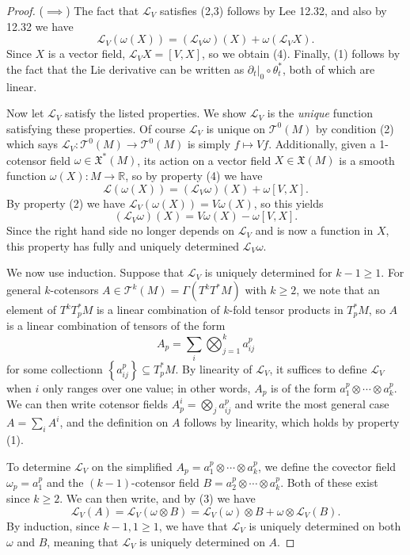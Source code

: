 \documentclass[11pt, letterpaper]{article}
\begin{document}
\begin{proof}
	($\implies $) The fact that $\mathcal{L} _V$ satisfies (2,3) follows by Lee 12.32, and also by 12.32 we have
	\[
		\mathcal{L} _V(\omega (X)) = (\mathcal{L} _V\omega )(X) + \omega (\mathcal{L} _VX)
	.\]
	Since $X$ is a vector field, $\mathcal{L} _VX=[V,X]$, so we obtain (4). Finally, (1) follows by the fact that the Lie derivative can be written as $\partial _t|_0 \circ \theta _t^*$, both of which are linear.

	Now let $\mathcal{L} _V$ satisfy the listed properties. We show $\mathcal{L} _V$ is the \emph{unique} function satisfying these properties. Of course $\mathcal{L} _V$ is unique on $\mathcal{T} ^0(M)$ by condition (2) which says $\mathcal{L} _V : \mathcal{T} ^0(M) \to \mathcal{T} ^0(M)$ is simply $f\mapsto Vf$. Additionally, given a 1-cotensor field $\omega \in \mathfrak{X} ^*(M)$, its action on a vector field $X\in \mathfrak{X} (M)$ is a smooth function $\omega (X): M \to \mathbb{R} $, so by property (4) we have
	\[
		\mathcal{L} (\omega (X)) = (\mathcal{L} _V\omega )(X) + \omega [V,X]
	.\]
	By property (2) we have $\mathcal{L} _V(\omega (X))=V\omega (X)$, so this yields
	\[
		(\mathcal{L} _V\omega )(X) = V\omega (X) - \omega [V,X]
	.\]
	Since the right hand side no longer depends on $\mathcal{L} _V$  and is now a function in $X$, this property has fully and uniquely determined $\mathcal{L} _V\omega $.

	We now use induction. Suppose that $\mathcal{L} _V$ is uniquely determined for $k-1 \geq 1$. For general $k$-cotensors $A\in\mathcal{T} ^k(M)=\Gamma (T^kT^*M)$ with $k\geq 2$, we note that an element of $T^kT^*_pM$ is a linear combination of $k$-fold tensor products in $T^*_pM$, so $A$ is a linear combination of tensors of the form
	\[
		A_p = \sum_{i} \bigotimes_{j=1}^k a_{ij}^p 
	\]
	for some collectionn $\left\{ a_{ij}^p  \right\} \subseteq T^*_pM$. By linearity of $\mathcal{L} _V$, it suffices to define $\mathcal{L} _V$ when $i$ only ranges over one value; in other words, $A_p$ is of the form $a_{1} ^p \otimes \cdots \otimes a_k^p$. We can then write cotensor fields $A^i_p = \bigotimes_{j} a_{ij} ^p$ and write the most general case $A = \sum_{i} A^i$, and the definition on $A$ follows by linearity, which holds by property (1).

	To determine $\mathcal{L} _V$ on the simplified $A_p=a_1^p \otimes \cdots\otimes a_k^p$, we define the covector field $\omega_p=a_1^p$ and the $(k-1)$-cotensor field $B=a_2^p \otimes \cdots\otimes a_k^p$. Both of these exist since $k\geq 2$. We can then write, and by (3) we have
	\[
		\mathcal{L}_V(A)=\mathcal{L} _V(\omega \otimes B)=\mathcal{L} _V(\omega )\otimes B+\omega \otimes \mathcal{L} _V(B)
	.\]
	By induction, since $k-1,1 \geq 1$, we have that $\mathcal{L} _V$ is uniquely determined on both $\omega $ and $B$, meaning that $\mathcal{L} _V$ is uniquely determined on $A$.
\end{proof}
\end{document}
